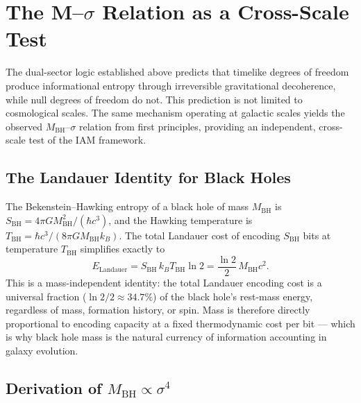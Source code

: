 \documentclass[twocolumn,a4paper,aps,prd,twocolumn,showpacs,notitlepage,superscriptaddress,nofootinbib]{article}
\begin{document}
\section{The M--$\sigma$ Relation as a Cross-Scale Test}
\label{sec:msigma}

The dual-sector logic established above predicts that timelike degrees of
freedom produce informational entropy through irreversible gravitational
decoherence, while null degrees of freedom do not.  This prediction is not
limited to cosmological scales.  The same mechanism operating at galactic
scales yields the observed $M_\mathrm{BH}$--$\sigma$ relation from first
principles, providing an independent, cross-scale
test of the IAM framework.

\subsection{The Landauer Identity for Black Holes}

The Bekenstein--Hawking entropy of a black hole of mass $M_\mathrm{BH}$ is
$S_\mathrm{BH} = 4\pi G M_\mathrm{BH}^2/(\hbar c^3)$, and the Hawking
temperature is $T_\mathrm{BH} = \hbar c^3/(8\pi G M_\mathrm{BH} k_B)$.
The total Landauer cost of encoding $S_\mathrm{BH}$ bits at temperature
$T_\mathrm{BH}$ simplifies exactly to
\begin{equation}
  E_\mathrm{Landauer} = S_\mathrm{BH}\,k_B T_\mathrm{BH}\ln 2
  = \frac{\ln 2}{2}\,M_\mathrm{BH} c^2.
  \label{eq:landauer_identity}
\end{equation}
This is a mass-independent identity: the total Landauer encoding cost is a
universal fraction ($\ln 2/2 \approx 34.7\%$) of the black hole's rest-mass
energy, regardless of mass, formation history, or spin.  Mass is therefore
directly proportional to encoding capacity at a fixed thermodynamic cost per
bit --- which is why black hole mass is the natural currency of information
accounting in galaxy evolution.

\subsection{Derivation of $M_\mathrm{BH} \propto \sigma^4$}
\end{document}
